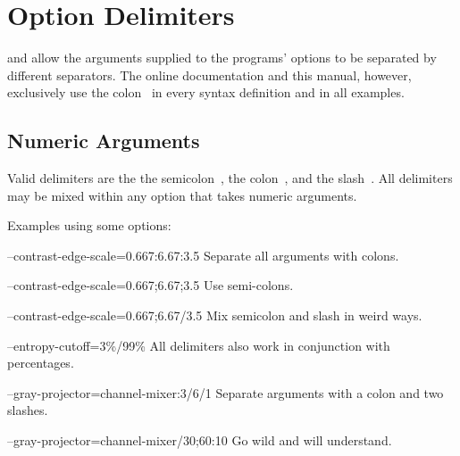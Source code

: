

\section[Option Delimiters\commonpart]{\label{sec:option-delimiters}%
  Option Delimiters\commonpart}

\App{} and \OtherApp{} allow the arguments supplied to the programs' options to be separated by
different separators.  The online documentation and this manual, however, exclusively use the
colon~\sample{:} in every syntax definition and in all examples.


\subsection[Numeric Arguments]{\label{sec:option-delimiters-numeric-arguments}%
  Numeric Arguments}

Valid delimiters are the the semicolon~\sample{;}, the colon~\sample{:}, and the
slash~\sample{/}.  All delimiters may be mixed within any option that takes numeric arguments.

Examples using some  options:

\begin{codelist}
\item[--contrast-edge-scale=0.667:6.67:3.5]\itemend
  Separate all arguments with colons.

\item[--contrast-edge-scale=0.667;6.67;3.5]\itemend
  Use semi-colons.

\item[--contrast-edge-scale=0.667;6.67/3.5]\itemend
  Mix semicolon and slash in weird ways.

\item[--entropy-cutoff=3\%/99\%]\itemend
  All delimiters also work in conjunction with percentages.

\item[--gray-projector=channel-mixer:3/6/1]\itemend
  Separate arguments with a colon and two slashes.

\item[--gray-projector=channel-mixer/30;60:10]\itemend
  Go wild and  will understand.
\end{codelist}


